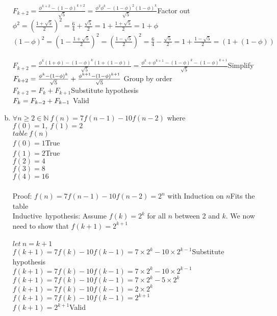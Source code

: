 \documentclass[11pt,letterpaper]{article}
\begin{document}
\begin{enumerate}[(a)]
$F_{k+2} = \frac{\phi^{k+2}-(1-\phi)^{k+2}}{\sqrt{5}}
= \frac{\phi^2\phi^{k}-(1-\phi)^{2}(1-\phi)^{k}}{\sqrt{5}}$\hfill Factor out\\
$\phi^2 = (\frac{1+\sqrt{5}}{2})^2=\frac{6}{4}+\frac{\sqrt{5}}{2}=1 +\frac{1+\sqrt{5}}{2}
= 1+\phi$\\
$(1-\phi)^2=(1-\frac{1+\sqrt{5}}{2})^2=(\frac{1-\sqrt{5}}{2})^2=\frac{6}{4}-\frac{\sqrt{5}}{2}=1+\frac{1-\sqrt{5}}{2}=(1+(1-\phi))$\\
\\
$F_{k+2} = \frac{\phi^{k}(1+\phi)-(1-\phi)^{k}(1+(1-\phi))}{\sqrt{5}}
= \frac{\phi^{k}+\phi^{k+1}-(1-\phi)^{k}-(1-\phi)^{k+1}}{\sqrt{5}}$\hfill Simplify\\
$F_{k+2} =\frac{\phi^{k}-(1-\phi)^{k}}{\sqrt{5}} + 
\frac{\phi^{k+1}-(1-\phi)^{k+1}}{\sqrt{5}}\hfill$ Group by order\\
$F_{k+2} = F_{k} +F_{k+1}$\hfill Substitute hypothesis\\
$F_k = F_{k-2}+F_{k-1}\hfill$ Valid

\item
$\forall n\geq2\in\mathbb{N}~f(n)=7f(n-1)-10f(n-2)$ where $f(0) = 1,~ f(1) = 2$\\
$table~f(n)$\\
$f(0) = 1$\hfill True\\
$f(1) =2$\hfill True\\
$f(2)=4$\\
$f(3)=8$\\
$f(4)=16$\\\\
Proof:
$f(n)=7f(n-1)-10f(n-2)=2^n$ with Induction on $n$\hfill Fits the table\\
Inductive~hypothesis: Assume $f(k)=2^k$ for all $n$ between 2 and $k$. We now need to show that $f(k+1) = 2^{k+1}$\\
\\
$let~n=k+1$\\
$f(k+1)=7f(k)-10f(k-1)=7\times2^{k}-10\times2^{k-1}$\hfill Substitute hypothesis\\
$f(k+1)=7f(k)-10f(k-1)=7\times2^{k}-10\times2^{k-1}$\\
$f(k+1)=7f(k)-10f(k-1)=7\times2^{k}-5\times2^{k}$\\
$f(k+1)=7f(k)-10f(k-1)=2\times2^{k}$\\
$f(k+1)=7f(k)-10f(k-1)=2^{k+1}$\\
$f(k+1) = 2^{k+1}$\hfill Valid\\

\end{enumerate}
\clearpage
\end{document}
